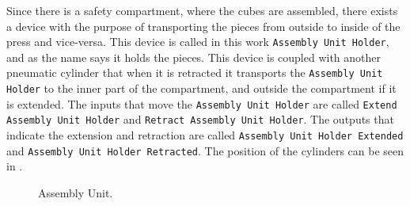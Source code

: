 Since there is a safety compartment, where the cubes are assembled, there exists
a device with the purpose of transporting the pieces from outside to inside of
the press
and vice-versa. This device is called in this work
\verb|Assembly Unit Holder|, and as the name says it holds the pieces. This
device is coupled with another pneumatic cylinder that when it is retracted
it transports the \verb|Assembly Unit Holder| to the inner part of the
compartment, and outside the compartment if it is extended. The inputs that move
the \verb|Assembly Unit Holder| are called
\verb|Extend Assembly Unit Holder| and
\verb|Retract Assembly Unit Holder|. The outputs that indicate the extension and
retraction are called \verb|Assembly Unit Holder Extended|
and \verb|Assembly Unit Holder Retracted|. The position of the cylinders can be
seen in .
\begin{figure}[H]
  \centering
  \caption{Assembly Unit.}
  \label{fig:assemblyUnit}
\end{figure}

